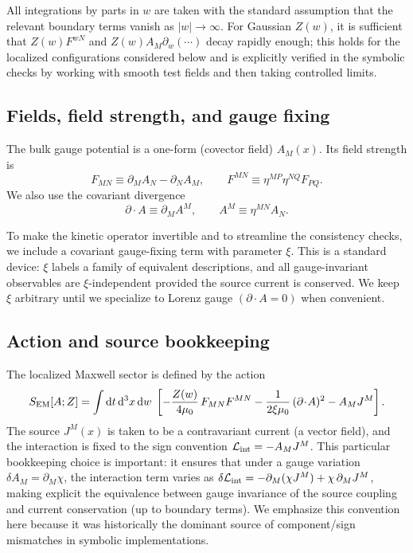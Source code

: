 \documentclass[11pt]{article}
\newcommand{\dd}{\mathrm d}
\newcommand{\A}{A}
\newcommand{\F}{F}
\newcommand{\J}{J}
\newcommand{\Z}{Z}
\newcommand{\muo}{\mu_0}
\newcommand{\xigf}{\xi}
\begin{document}
All integrations by parts in \(w\) are taken with the standard assumption that the
relevant boundary terms vanish as \(|w|\to\infty\). For Gaussian \(\Z(w)\), it is
sufficient that \(\Z(w)\F^{wN}\) and \(\Z(w)\A_M\partial_w(\cdots)\) decay rapidly
enough; this holds for the localized configurations considered below and is
explicitly verified in the symbolic checks by working with smooth test fields and
then taking controlled limits.

\subsection{Fields, field strength, and gauge fixing}
\label{sec:fields}

The bulk gauge potential is a one-form (covector field) \(\A_M(x)\). Its field
strength is
\begin{equation}
  \F_{MN} \equiv \partial_M \A_N - \partial_N \A_M,
  \qquad
  \F^{MN} \equiv \eta^{MP}\eta^{NQ}\F_{PQ}.
  \label{eq:F_def}
\end{equation}
We also use the covariant divergence
\begin{equation}
  \partial\!\cdot\!\A \equiv \partial_M \A^M,
  \qquad
  \A^M \equiv \eta^{MN}\A_N.
\end{equation}

To make the kinetic operator invertible and to streamline the consistency checks,
we include a covariant gauge-fixing term with parameter \(\xigf\). This is a
standard device: \(\xigf\) labels a family of equivalent descriptions, and all
gauge-invariant observables are \(\xigf\)-independent provided the source current
is conserved. We keep \(\xigf\) arbitrary until we specialize to Lorenz gauge
\((\partial\!\cdot\!\A=0)\) when convenient.

\subsection{Action and source bookkeeping}
\label{sec:action}

The localized Maxwell sector is defined by the action
\begin{equation}
  S_{\rm EM}[\A;\Z]
  = \int \dd t\,\dd^3x\,\dd w\;
  \left[
    -\frac{\Z(w)}{4\muo}\,\F_{MN}\F^{MN}
    -\frac{1}{2\xigf\muo}\,(\partial\!\cdot\!\A)^2
    - \A_M \J^M
  \right].
  \label{eq:action_em}
\end{equation}
The source \(\J^M(x)\) is taken to be a contravariant current (a vector field),
and the interaction is fixed to the sign convention
\(\mathcal L_{\rm int}=-\A_M\J^M\). This particular bookkeeping choice is
important: it ensures that under a gauge variation \(\delta \A_M=\partial_M\chi\),
the interaction term varies as
\(\delta\mathcal L_{\rm int}=-\partial_M(\chi \J^M)+\chi\,\partial_M\J^M\),
making explicit the equivalence between gauge invariance of the source coupling
and current conservation (up to boundary terms). We emphasize this convention here
because it was historically the dominant source of component/sign mismatches in
symbolic implementations.
\end{document}
